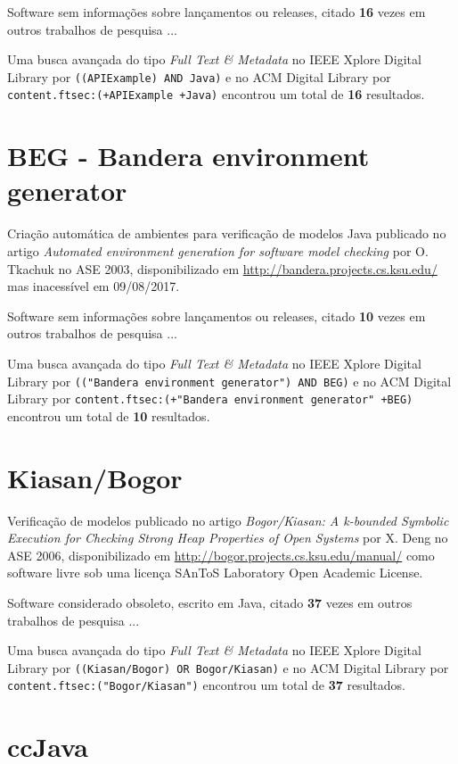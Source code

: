 Software sem informações sobre lançamentos ou releases,
citado {\bf 16} vezes em outros trabalhos de pesquisa ...

Uma busca avançada do tipo {\it Full Text \& Metadata} no IEEE Xplore Digital Library por
\texttt{((APIExample) AND Java)}
e no ACM Digital Library por
\texttt{content.ftsec:(+APIExample +Java)}
encontrou um total de
{\bf 16}
resultados.

\section{BEG - Bandera environment generator}

Criação automática de ambientes para verificação de modelos Java
publicado no artigo {\it Automated environment generation for software model checking}
por O. Tkachuk
no ASE 2003,
disponibilizado em \url{http://bandera.projects.cs.ksu.edu/}
mas inacessível em 09/08/2017.

Software sem informações sobre lançamentos ou releases,
citado {\bf 10} vezes em outros trabalhos de pesquisa ...

Uma busca avançada do tipo {\it Full Text \& Metadata} no IEEE Xplore Digital Library por
\texttt{(("Bandera environment generator") AND BEG)}
e no ACM Digital Library por
\texttt{content.ftsec:(+"Bandera environment generator" +BEG)}
encontrou um total de
{\bf 10}
resultados.

\section{Kiasan/Bogor}

Verificação de modelos
publicado no artigo {\it Bogor/Kiasan: A k-bounded Symbolic Execution for Checking Strong Heap Properties of Open Systems}
por X. Deng
no ASE 2006,
disponibilizado em \url{http://bogor.projects.cs.ksu.edu/manual/}
como software livre
sob uma licença SAnToS Laboratory Open Academic License.

Software considerado obsoleto,
escrito em Java,
citado {\bf 37} vezes em outros trabalhos de pesquisa ...

Uma busca avançada do tipo {\it Full Text \& Metadata} no IEEE Xplore Digital Library por
\texttt{((Kiasan/Bogor) OR Bogor/Kiasan)}
e no ACM Digital Library por
\texttt{content.ftsec:("Bogor/Kiasan")}
encontrou um total de
{\bf 37}
resultados.

\section{ccJava}

